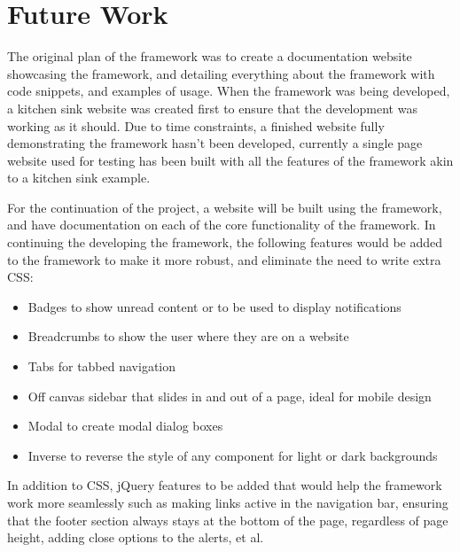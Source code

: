 \newpage
\chapter*{Future Work}



The original plan of the framework was to create a documentation website showcasing the framework, and detailing everything about the framework with code snippets, and examples of usage. When the framework was being developed, a kitchen sink website was created first to ensure that the development was working as it should. Due to time constraints, a finished website fully demonstrating the framework hasn't been developed, currently a single page website used for testing has been built with all the features of the framework akin to a kitchen sink example. 

For the continuation of the project, a website will be built using the framework, and have documentation on each of the core functionality of the framework. In continuing the developing the framework, the following features would be added to the framework to make it more robust, and eliminate the need to write extra CSS:
\begin{itemize}
	\item Badges to show unread content or to be used to display notifications
	\item Breadcrumbs to show the user where they are on a website
	\item Tabs for tabbed navigation
	\item Off canvas sidebar that slides in and out of a page, ideal for mobile design
	\item Modal to create modal dialog boxes
	\item Inverse to reverse the style of any component for light or dark backgrounds
\end{itemize}

In addition to CSS, jQuery features to be added that would help the framework work more seamlessly such as making links active in the navigation bar, ensuring that the footer section always stays at the bottom of the page, regardless of page height, adding close options to the alerts, et al. 

%
%

